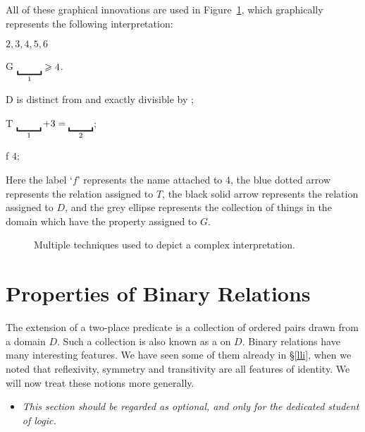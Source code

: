 All of these graphical innovations are used in Figure~\ref{fig:complex}, which  graphically represents the following interpretation: \begin{ekey}
	\item[\text{domain}] $2,3,4,5,6$
	\item[G] $\gap{1} \geqslant 4$. 
	\item[D]  is distinct from and exactly divisible by ;
	\item[T] $\gap{1} + 3 = \gap{2}$;
	\item[f] $4$;
\end{ekey} 
Here the label `$f$' represents the name attached to 4, the blue dotted arrow represents the relation assigned to $T$, the black solid arrow represents the relation assigned to $D$, and the grey ellipse represents the collection of things in the domain which have the property assigned to $G$. 
\begin{figure}
\caption{\label{fig:complex}Multiple techniques used to depict a complex interpretation.}
\end{figure}

\section{Properties of Binary Relations} \label{binary}


The extension of a two-place predicate is a collection of ordered pairs drawn from a domain $D$. Such a collection is also known as a  on $D$. Binary relations have many interesting features. We have seen some of them already in §\ref{lli}, when we noted that reflexivity, symmetry and transitivity are all features of identity. We will now treat these notions more generally. 

\begin{itemize}
 	\item \emph{This section should be regarded as optional, and only for the dedicated student of logic.}
 \end{itemize} 

